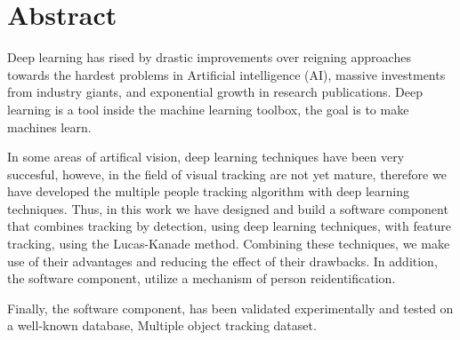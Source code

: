 \chapter*{Abstract}

Deep learning has rised by drastic improvements over reigning approaches towards the hardest problems in Artificial intelligence (AI), massive investments from industry giants, and exponential growth in research publications. Deep learning is a tool inside the machine learning toolbox, the goal is to make machines learn.

In some areas of artifical vision, deep learning techniques have been very succesful, howeve, in the field of visual tracking  are not yet mature, therefore we have developed the multiple people tracking algorithm with deep learning techniques. Thus, in this work we have designed and build a software component that combines tracking by detection, using deep learning techniques, with feature tracking, using the Lucas-Kanade method. Combining these techniques, we make use of their advantages and reducing the effect of their drawbacks. In addition, the software component, utilize a mechanism of person reidentification.

Finally, the software component, has been validated experimentally and tested on a well-known database, Multiple object tracking dataset.

